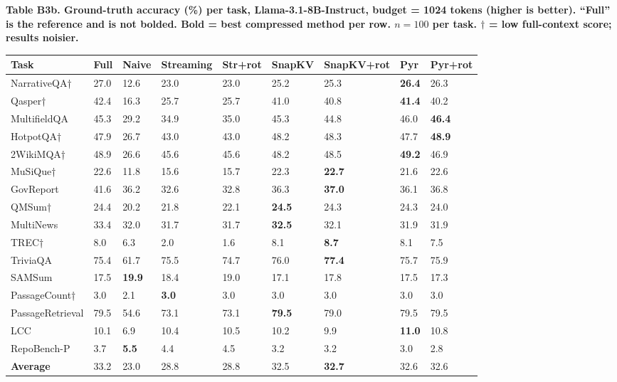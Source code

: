 \documentclass[10pt,letterpaper]{article}
\begin{document}
\textbf{Table B3b. Ground-truth accuracy (\%) per task, Llama-3.1-8B-Instruct,
budget = 1024 tokens (higher is better). ``Full'' is the reference and is not bolded.
Bold = best compressed method per row. $n = 100$ per task.
\(\dagger\) = low full-context score; results noisier.}

\begin{table}[H]
\centering
\small
\begin{tabular}{@{}lllllllll@{}}
\toprule
Task & Full & Naive & Streaming & Str+rot & SnapKV & SnapKV+rot & Pyr &
Pyr+rot\\
\midrule
NarrativeQA† & 27.0 & 12.6 & 23.0 & 23.0 & 25.2 & 25.3 & \textbf{26.4} &
26.3\\
Qasper† & 42.4 & 16.3 & 25.7 & 25.7 & 41.0 & 40.8 & \textbf{41.4} &
40.2\\
MultifieldQA & 45.3 & 29.2 & 34.9 & 35.0 & 45.3 & 44.8 & 46.0 &
\textbf{46.4}\\
HotpotQA† & 47.9 & 26.7 & 43.0 & 43.0 & 48.2 & 48.3 & 47.7 &
\textbf{48.9}\\
2WikiMQA† & 48.9 & 26.6 & 45.6 & 45.6 & 48.2 & 48.5 & \textbf{49.2} &
46.9\\
MuSiQue† & 22.6 & 11.8 & 15.6 & 15.7 & 22.3 & \textbf{22.7} & 21.6 &
22.6\\
GovReport & 41.6 & 36.2 & 32.6 & 32.8 & 36.3 & \textbf{37.0} & 36.1 &
36.8\\
QMSum† & 24.4 & 20.2 & 21.8 & 22.1 & \textbf{24.5} & 24.3 & 24.3 &
24.0\\
MultiNews & 33.4 & 32.0 & 31.7 & 31.7 & \textbf{32.5} & 32.1 & 31.9 &
31.9\\
TREC† & 8.0 & 6.3 & 2.0 & 1.6 & 8.1 & \textbf{8.7} & 8.1 &
7.5\\
TriviaQA & 75.4 & 61.7 & 75.5 & 74.7 & 76.0 & \textbf{77.4} & 75.7 &
75.9\\
SAMSum & 17.5 & \textbf{19.9} & 18.4 & 19.0 & 17.1 & 17.8 & 17.5 &
17.3\\
PassageCount† & 3.0 & 2.1 & \textbf{3.0} & 3.0 & 3.0 & 3.0 & 3.0 &
3.0\\
PassageRetrieval & 79.5 & 54.6 & 73.1 & 73.1 & \textbf{79.5} & 79.0 & 79.5 &
79.5\\
LCC & 10.1 & 6.9 & 10.4 & 10.5 & 10.2 & 9.9 & \textbf{11.0} &
10.8\\
RepoBench-P & 3.7 & \textbf{5.5} & 4.4 & 4.5 & 3.2 & 3.2 & 3.0 &
2.8\\
\textbf{Average} & 33.2 & 23.0 & 28.8 & 28.8 & 32.5 & \textbf{32.7} & 32.6 &
32.6\\
\bottomrule
\end{tabular}
\end{table}
\end{document}
